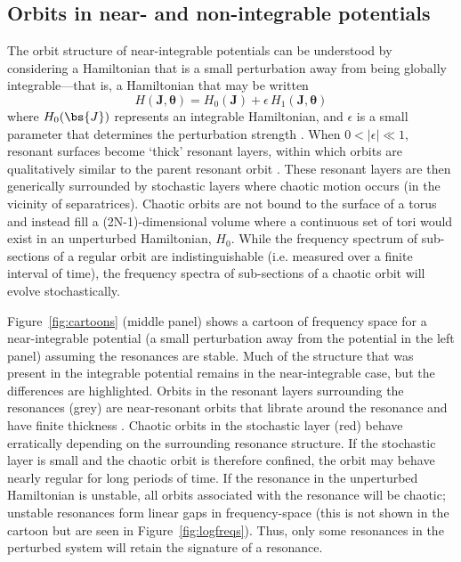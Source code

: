\subsection{Orbits in near- and non-integrable potentials}

The orbit structure of near-integrable potentials can be understood by
considering a Hamiltonian that is a small perturbation away from being globally
integrable---that is, a Hamiltonian that may be written
\begin{equation}
	H(\boldsymbol{J}, \boldsymbol{\theta}) = H_0(\boldsymbol{J}) + \epsilon \, H_1(\boldsymbol{J}, \boldsymbol{\theta})
\end{equation}
where $H_0(\bs{J})$ represents an integrable Hamiltonian, and $\epsilon$ is a
small parameter that determines the perturbation strength \citep[a description
of perturbation theory applied to nonlinear Hamiltonians is given
in][]{lichtenberg83}. When $0 < |\epsilon| \ll 1$, resonant surfaces become
`thick' resonant layers, within which orbits are qualitatively similar to the
parent resonant orbit \citep[e.g.,][]{merritt99}. These resonant layers are then
generically surrounded by stochastic layers where chaotic motion occurs (in the
vicinity of separatrices). Chaotic orbits are not bound to the surface of a
torus and instead fill a (2N-1)-dimensional volume where a continuous set of
tori would exist in an unperturbed Hamiltonian, $H_0$. While the frequency
spectrum of sub-sections of a regular orbit are indistinguishable (i.e. measured
over a finite interval of time), the frequency spectra of sub-sections of a
chaotic orbit will evolve stochastically.

Figure~\ref{fig:cartoons} (middle panel) shows a cartoon of frequency space for
a near-integrable potential (a small perturbation away from the potential in the
left panel) assuming the resonances are stable. Much of the structure that was
present in the integrable potential remains in the near-integrable case, but the
differences are highlighted. Orbits in the resonant layers surrounding the
resonances (grey) are near-resonant orbits that librate around the resonance and
have finite thickness \citep[e.g.,][]{merritt99}. Chaotic orbits in the
stochastic layer (red) behave erratically depending on the surrounding resonance
structure. If the stochastic layer is small and the chaotic orbit is therefore
confined, the orbit may behave nearly regular for long periods of time. If the
resonance in the unperturbed Hamiltonian is unstable, all orbits associated with
the resonance will be chaotic; unstable resonances form linear gaps in
frequency-space (this is not shown in the cartoon but are seen in
Figure~\ref{fig:logfreqs}). Thus, only some resonances in the perturbed system
will retain the signature of a resonance.

